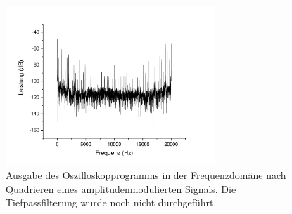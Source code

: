 \documentclass[
a4paper,
12pt,
pagesize,
ngerman
]{scrartcl}
\begin{document}

	\begin{figure}[H]  
		\includegraphics[width=0.7\textwidth]{Origin-Files/AM-Demod-Quadrat-preTP}
		\centering
		\caption{Ausgabe des Oszilloskopprogramms in der Frequenzdomäne nach Quadrieren eines amplitudenmodulierten Signals. Die Tiefpassfilterung wurde noch nicht durchgeführt.
		}
		\label{fig_tag3_am_demod_quadrat_preTP}
		\centering
	\end{figure}
\end{document}
